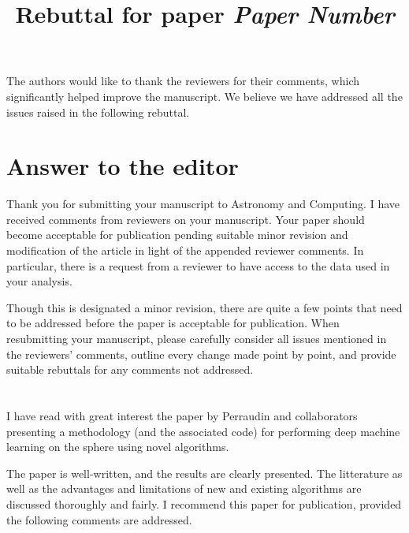 \documentclass[12pt,a4paper]{article}
\title{\vspace{-1cm}
\begin{flushleft} {\sffamily Rebuttal for paper \emph{Paper Number} }\end{flushleft}}
\date{\vspace{-1.7cm}\begin{flushleft}\sffamily DeepSphere: Efficient spherical Convolutional Neural Network with HEALPix sampling for cosmological applications, Nathanaël Perraudin, Michaël Defferrard, Tomasz Kacprzak, Raphael Sgier \end{flushleft}}
\newcommand{\todo}[1]{{\color[rgb]{.6,.1,.6}{TODO: #1}}}
\newcommand{\1}{\b{1}}              %
\newcommand{\0}{\b{0}}              %
\begin{document}
\maketitle


The authors would like to thank the reviewers for their comments, which significantly helped improve the manuscript. We believe we have addressed all the issues raised in the following rebuttal. 

\section*{Answer to the editor}


\begin{mdframed}[style=comment] 
Thank you for submitting your manuscript to Astronomy and Computing. I have received comments from reviewers on your manuscript. Your paper should become acceptable for publication pending suitable minor revision and modification of the article in light of the appended reviewer comments.  In particular, there is a request from a reviewer to have access to the data used in your analysis.  

Though this is designated a minor revision, there are quite a few points that need to be addressed before the paper is acceptable for publication.  When resubmitting your manuscript, please carefully consider all issues mentioned in the reviewers' comments, outline every change made point by point, and provide suitable rebuttals for any comments not addressed.
\end{mdframed}

\todo{Answer to editor}

\section{}

\subsection{}

\begin{mdframed}[style=comment] 
I have read with great interest the paper by Perraudin and collaborators presenting a methodology (and the associated code) for performing deep machine learning on the sphere using novel algorithms. 

The paper is well-written, and the results are clearly presented. The litterature as well as the advantages and limitations of new and existing algorithms are discussed thoroughly and fairly. I recommend this paper for publication, provided the following comments are addressed.
\end{mdframed}
\end{document}
